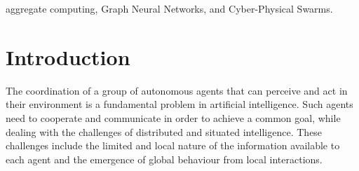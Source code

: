 \documentclass[conference]{IEEEtran}
\begin{document}
\begin{IEEEkeywords}
aggregate computing, Graph Neural Networks, and Cyber-Physical Swarms.
\end{IEEEkeywords}
%
\section{Introduction}

%
%


The coordination of a group of autonomous agents that can perceive and act in their environment is a fundamental problem in artificial intelligence. 
Such agents need to cooperate and communicate in order to achieve a common goal, 
 while dealing with the challenges of distributed and situated intelligence. 
 These challenges include the limited and local nature of the information available to each agent and the emergence of global behaviour from local interactions. 
\end{document}
